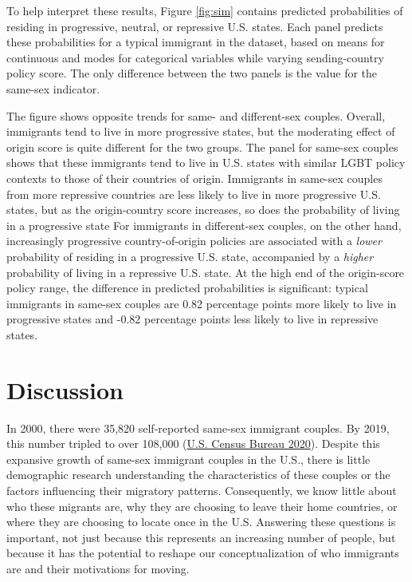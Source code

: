 \documentclass[
  11pt,
]{article}
\begin{document}
To help interpret these results, Figure \ref{fig:sim} contains predicted probabilities of residing in progressive, neutral, or repressive U.S. states. Each panel predicts these probabilities for a typical immigrant in the dataset, based on means for continuous and modes for categorical variables while varying sending-country policy score. The only difference between the two panels is the value for the same-sex indicator.

The figure shows opposite trends for same- and different-sex couples. Overall, immigrants tend to live in more progressive states, but the moderating effect of origin score is quite different for the two groups. The panel for same-sex couples shows that these immigrants tend to live in U.S. states with similar LGBT policy contexts to those of their countries of origin. Immigrants in same-sex couples from more repressive countries are less likely to live in more progressive U.S. states, but as the origin-country score increases, so does the probability of living in a progressive state For immigrants in different-sex couples, on the other hand, increasingly progressive country-of-origin policies are associated with a \emph{lower} probability of residing in a progressive U.S. state, accompanied by a \emph{higher} probability of living in a repressive U.S. state. At the high end of the origin-score policy range, the difference in predicted probabilities is significant: typical immigrants in same-sex couples are 0.82 percentage points more likely to live in progressive states and -0.82 percentage points less likely to live in repressive states.

\hypertarget{discussion}{%
\section{Discussion}\label{discussion}}

In 2000, there were 35,820 self-reported same-sex immigrant couples. By 2019, this number tripled to over 108,000 (\protect\hyperlink{ref-u.s.censusbureau_2020}{U.S. Census Bureau 2020}). Despite this expansive growth of same-sex immigrant couples in the U.S., there is little demographic research understanding the characteristics of these couples or the factors influencing their migratory patterns. Consequently, we know little about who these migrants are, why they are choosing to leave their home countries, or where they are choosing to locate once in the U.S. Answering these questions is important, not just because this represents an increasing number of people, but because it has the potential to reshape our conceptualization of who immigrants are and their motivations for moving.
\end{document}
